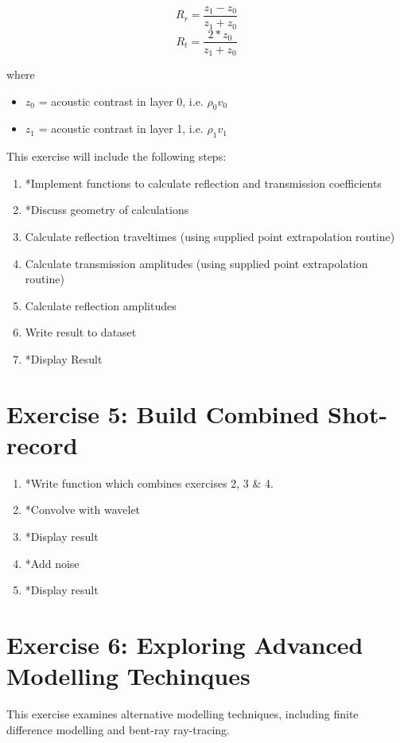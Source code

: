 \documentclass[a4paper, 10pt]{article}
\begin{document}
\[ R_r = \frac{z_1 - z_0}{z_1+z_0}\]
\[ R_t = \frac{2*z_0}{z_1+z_0}\]

where 
\begin{itemize}
\item $z_0$  = acoustic contrast in layer 0, i.e. $\rho_0 v_0$
\item $z_1$ = acoustic contrast in layer 1, i.e. $\rho_1 v_1$
\end{itemize}

This exercise will include the following steps:


\begin{enumerate}
\item *Implement functions to calculate reflection and transmission coefficients
\item *Discuss geometry of calculations
\item Calculate reflection traveltimes (using supplied point extrapolation routine)
\item Calculate transmission amplitudes (using supplied point extrapolation routine)
\item Calculate reflection amplitudes
\item Write result to dataset
\item *Display Result
\end{enumerate}


\section*{Exercise 5: Build Combined Shot-record}

\begin{enumerate}
\item *Write function which combines exercises 2, 3 \& 4.
\item *Convolve with wavelet
\item *Display result
\item *Add noise
\item *Display result
\end{enumerate}
\section*{Exercise 6: Exploring Advanced Modelling Techinques}

This exercise examines alternative modelling techniques, including finite difference modelling and bent-ray ray-tracing.

\newpage





%
\end{document}
